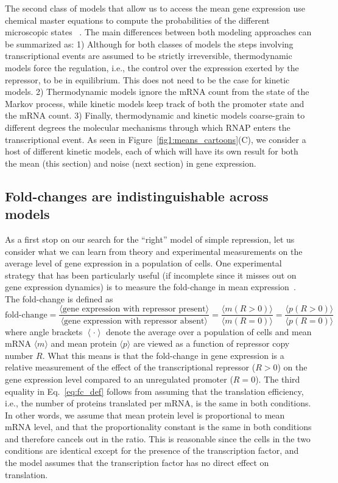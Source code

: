 The second class of models that allow us to access the mean gene expression use
chemical master equations to compute the probabilities of the different
microscopic states ~\cite{Ko1991, Peccoud1995, Record1996, Kepler2001,
Sanchez2008, Shahrezaei2008, Sanchez2011, Michel2010}. The main differences
between both modeling approaches can be summarized as: 1) Although for both
classes of models the steps involving transcriptional events are assumed to be
strictly irreversible, thermodynamic models force the regulation, i.e., the
control over the expression exerted by the repressor, to be in equilibrium. This
does not need to be the case for kinetic models. 2) Thermodynamic models ignore
the mRNA count from the state of the Markov process, while kinetic models keep
track of both the promoter state and the mRNA count. 3) Finally, thermodynamic
and kinetic models coarse-grain to different degrees the molecular mechanisms
through which RNAP enters the transcriptional event. As seen in
Figure~\ref{fig1:means_cartoons}(C), we consider a host of different kinetic
models, each of which will have its own result for both the mean (this section)
and noise (next section) in gene expression.

\subsection{Fold-changes are indistinguishable across models}
As a first stop on our search for the ``right'' model of simple repression, let
us consider what we can learn from theory and experimental measurements on the
average level of gene expression in a population of cells. One experimental
strategy that has been particularly useful (if incomplete since it misses out on
gene expression dynamics) is to measure the fold-change in mean
expression~\cite{Garcia2011}. The fold-change is defined as
\begin{equation}
\text{fold-change}
= \frac{\langle \text{gene expression with repressor present} \rangle}
        {\langle \text{gene expression with repressor absent} \rangle}
= \frac{\langle m (R > 0) \rangle}{\langle m (R = 0) \rangle}
= \frac{\langle p (R > 0) \rangle}{\langle p (R = 0) \rangle}
\label{eq:fc_def}
\end{equation}
where angle brackets $\left\langle \cdot \right\rangle$ denote the average over
a population of cells and mean mRNA $\langle m\rangle$ and mean protein $\langle
p\rangle$ are viewed as a function of repressor copy number $R$. What this means
is that the fold-change in gene expression is a relative measurement of the
effect of the transcriptional repressor ($R > 0$) on the gene expression level
compared to an unregulated promoter ($R = 0$). The third equality in
Eq.~\ref{eq:fc_def} follows from assuming that the translation efficiency, i.e.,
the number of proteins translated per mRNA, is the same in both conditions. In
other words, we assume that mean protein level is proportional to mean mRNA
level, and that the proportionality constant is the same in both conditions and
therefore cancels out in the ratio. This is reasonable since the cells in the
two conditions are identical except for the presence of the transcription
factor, and the model assumes that the transcription factor has no direct effect
on translation.

